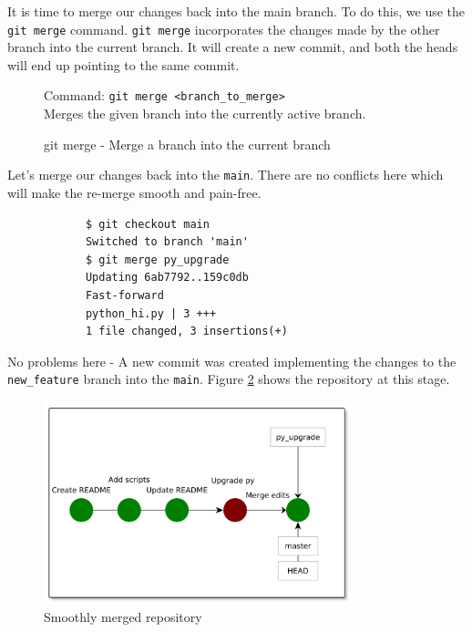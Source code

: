 \documentclass[../main/git_course_main.tex]{subfiles}
\begin{document}
	It is time to merge our changes back into the main branch.
	To do this, we use the \verb$git merge$ command. \verb$git merge$ incorporates the changes made by the other branch into the current branch.
	It will create a new commit, and both the heads will end up pointing to the same commit.
	
	\begin{figure}[h!]
		\begin{bluebox}
			Command: \verb$git merge <branch_to_merge>$ \\
			
			Merges the given branch into the currently active branch.
		\end{bluebox}
		\label{command:merge}
		\caption{git merge - Merge a branch into the current branch}
	\end{figure}
	
	Let's merge our changes back into the \verb$main$. There are no conflicts here
	which will make the re-merge smooth and pain-free.
	
	\begin{codebox}
		\begin{lstlisting}
			$ git checkout main
			Switched to branch 'main'
			$ git merge py_upgrade
			Updating 6ab7792..159c0db
			Fast-forward
			python_hi.py | 3 +++
			1 file changed, 3 insertions(+)
		\end{lstlisting}
	\end{codebox}
	
	No problems here - A new commit was created implementing the changes to the \verb$new_feature$ branch into the \verb$main$. Figure \ref{fig:smooth_merge} shows the repository at this stage.
	
	\begin{figure}[h!]
		\centering
		\includegraphics[width=0.8\textwidth]{../visualizations/chapter4/44_smoothly_merged_branch.pdf}
		\caption{Smoothly merged repository}
		\label{fig:smooth_merge}
	\end{figure}
	
\end{document}
